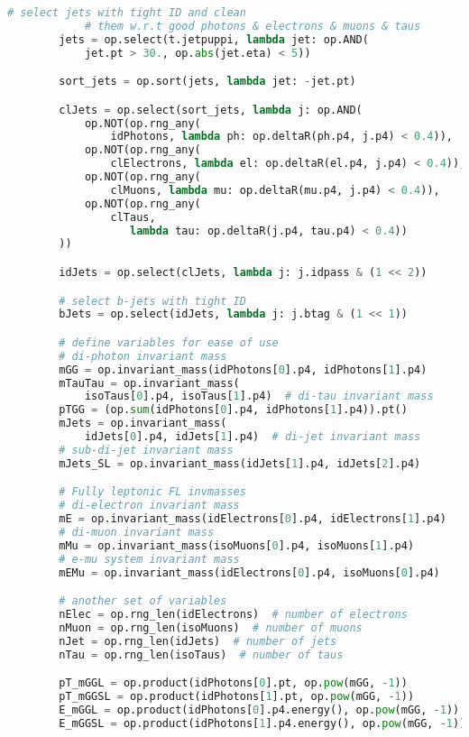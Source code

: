 \begin{lstlisting}[language=Python, caption=Python module of the analysis used in Bamboo framework, label={bamboocode}]
        # select jets with tight ID and clean 
            # them w.r.t good photons & electrons & muons & taus
        jets = op.select(t.jetpuppi, lambda jet: op.AND(
            jet.pt > 30., op.abs(jet.eta) < 5))

        sort_jets = op.sort(jets, lambda jet: -jet.pt)

        clJets = op.select(sort_jets, lambda j: op.AND(
            op.NOT(op.rng_any(
                idPhotons, lambda ph: op.deltaR(ph.p4, j.p4) < 0.4)),
            op.NOT(op.rng_any(
                clElectrons, lambda el: op.deltaR(el.p4, j.p4) < 0.4)),
            op.NOT(op.rng_any(
                clMuons, lambda mu: op.deltaR(mu.p4, j.p4) < 0.4)),
            op.NOT(op.rng_any(
                clTaus,
                   lambda tau: op.deltaR(j.p4, tau.p4) < 0.4))
        ))

        idJets = op.select(clJets, lambda j: j.idpass & (1 << 2))

        # select b-jets with tight ID
        bJets = op.select(idJets, lambda j: j.btag & (1 << 1))

        # define variables for ease of use
        # di-photon invariant mass
        mGG = op.invariant_mass(idPhotons[0].p4, idPhotons[1].p4)
        mTauTau = op.invariant_mass(
            isoTaus[0].p4, isoTaus[1].p4)  # di-tau invariant mass
        pTGG = (op.sum(idPhotons[0].p4, idPhotons[1].p4)).pt()
        mJets = op.invariant_mass(
            idJets[0].p4, idJets[1].p4)  # di-jet invariant mass
        # sub-di-jet invariant mass
        mJets_SL = op.invariant_mass(idJets[1].p4, idJets[2].p4)

        # Fully leptonic FL invmasses
        # di-electron invariant mass
        mE = op.invariant_mass(idElectrons[0].p4, idElectrons[1].p4)
        # di-muon invariant mass
        mMu = op.invariant_mass(isoMuons[0].p4, isoMuons[1].p4)
        # e-mu system invariant mass
        mEMu = op.invariant_mass(idElectrons[0].p4, isoMuons[0].p4)

        # another set of variables
        nElec = op.rng_len(idElectrons)  # number of electrons
        nMuon = op.rng_len(isoMuons)  # number of muons
        nJet = op.rng_len(idJets)  # number of jets
        nTau = op.rng_len(isoTaus)  # number of taus

        pT_mGGL = op.product(idPhotons[0].pt, op.pow(mGG, -1))
        pT_mGGSL = op.product(idPhotons[1].pt, op.pow(mGG, -1))
        E_mGGL = op.product(idPhotons[0].p4.energy(), op.pow(mGG, -1))
        E_mGGSL = op.product(idPhotons[1].p4.energy(), op.pow(mGG, -1))


\end{lstlisting}
